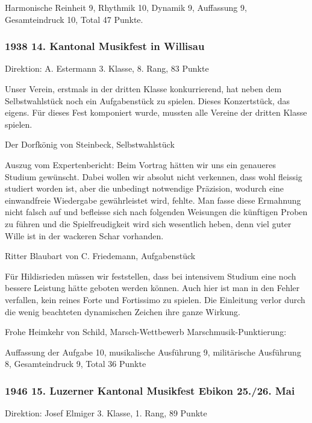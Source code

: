 \begin{history}
    Harmonische Reinheit 9, Rhythmik 10, Dynamik 9, Auffassung 9, Gesamteindruck
    10, Total 47 Punkte.



    \subsubsection{1938 14. Kantonal Musikfest in Willisau}

    Direktion: A. Estermann 3. Klasse, 8. Rang, 83 Punkte

    Unser Verein, erstmals in der dritten Klasse konkurrierend, hat neben dem
    Selbstwahlstück noch ein Aufgabenstück zu spielen. Dieses Konzertstück, das
    eigens. Für dieses Fest komponiert wurde, mussten alle Vereine der dritten
    Klasse spielen.

    Der Dorfkönig von Steinbeck, Selbstwahlstück

    Auszug vom Expertenbericht: Beim Vortrag hätten wir uns ein genaueres
    Studium gewünscht. Dabei wollen wir absolut nicht verkennen, dass wohl
    fleissig studiert worden ist, aber die unbedingt notwendige Präzision,
    wodurch eine einwandfreie Wiedergabe gewährleistet wird, fehlte. Man fasse
    diese Ermahnung nicht falsch auf und befleisse sich nach folgenden Weisungen
    die künftigen Proben zu führen und die Spielfreudigkeit wird sich wesentlich
    heben, denn viel guter Wille ist in der wackeren Schar vorhanden.

    Ritter Blaubart von C. Friedemann, Aufgabenstück

    Für Hildisrieden müssen wir feststellen, dass bei intensivem Studium eine
    noch bessere Leistung hätte geboten werden können. Auch hier ist man in den
    Fehler verfallen, kein reines Forte und Fortissimo zu spielen. Die
    Einleitung verlor durch die wenig beachteten dynamischen Zeichen ihre ganze
    Wirkung.

    Frohe Heimkehr von Schild, Marsch-Wettbewerb Marschmusik-Punktierung:

    Auffassung der Aufgabe 10, musikalische Ausführung 9, militärische
    Ausführung 8, Gesamteindruck 9, Total 36 Punkte

    \subsubsection{1946 15. Luzerner Kantonal Musikfest Ebikon 25./26. Mai}

    Direktion: Josef Elmiger 3. Klasse, 1. Rang, 89 Punkte


\end{history}
